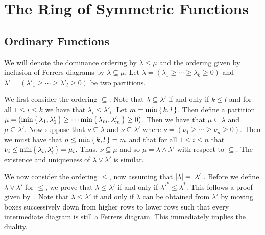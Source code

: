 \documentclass[letterpaper, 11pt, oneside]{book}
\begin{document}
\clearpage

\chapter{\cite{book:ManivelSFSPDL} The Ring of Symmetric Functions}

\section{Ordinary Functions}

\begin{sol}\label{ex:Manivel_1.1.2}
  We will denote the dominance ordering by $\lambda \leq \mu$ and the ordering given by inclusion of Ferrers diagrams by $\lambda \subseteq \mu$.
  Let $\lambda = (\lambda_{1} \geq \cdots \geq \lambda_{k} \geq 0)$ and $\lambda' = (\lambda'_{1} \geq \cdots \geq \lambda'_{l} \geq 0)$ be two partitions.

  We first consider the ordering $\subseteq$.
  Note that $\lambda \subseteq \lambda'$ if and only if $k \leq l$ and for all $1 \leq i \leq k$ we have that $\lambda_{i} \leq \lambda'_{i}$.
  Let $m = \min\set{k, l}$.
  Then define a partition $\mu = (\min\set{\lambda_{1}, \lambda'_{1}} \geq \cdots \min\set{\lambda_{m}, \lambda'_{m}} \geq 0)$.
  Then we have that $\mu \subseteq \lambda$ and $\mu \subseteq \lambda'$.
  Now suppose that $\nu \subseteq \lambda$ and $\nu \subseteq \lambda'$ where $\nu = (\nu_{1} \geq \cdots \geq \nu_{n} \geq 0)$.
  Then we must have that $n \leq \min\set{k, l} = m$ and that for all $1 \leq i \leq n$ that $\nu_{i} \leq \min\set{\lambda_{i}, \lambda'_{i}} = \mu_{i}$.
  Thus, $\nu \subseteq \mu$ and so $\mu = \lambda \land \lambda'$ with respect to $\subseteq$.
  The existence and uniqueness of $\lambda \lor \lambda'$ is similar.

  We now consider the ordering $\leq$, now assuming that $\abs{\lambda} = \abs{\lambda'}$.
  Before we define $\lambda \lor \lambda'$ for $\leq$, we prove that $\lambda \leq \lambda'$ if and only if ${\lambda'}^{*} \leq \lambda^{*}$.
  This follows a proof given by~\cite{SE:dominance_conjugation}.
  Note that $\lambda \leq \lambda'$ if and only if $\lambda$ can be obtained from $\lambda'$ by moving boxes successively down from higher rows to lower rows such that every intermediate diagram is still a Ferrers diagram.
  This immediately implies the duality.


\end{sol}
\end{document}
